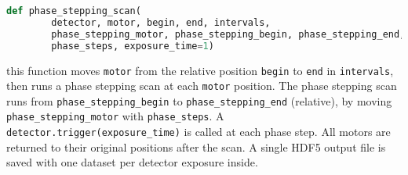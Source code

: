 \begin{lstlisting}[language=Python]
def phase_stepping_scan(
        detector, motor, begin, end, intervals,
        phase_stepping_motor, phase_stepping_begin, phase_stepping_end,
        phase_steps, exposure_time=1)
\end{lstlisting}
this function moves \texttt{motor} from the relative position \texttt{begin}
to \texttt{end} in \texttt{intervals}, then runs a phase stepping scan at
each \texttt{motor} position. The phase stepping scan runs from
\texttt{phase\_stepping\_begin} to
\texttt{phase\_stepping\_end} (relative), by moving
\texttt{phase\_stepping\_motor} with 
\texttt{phase\_steps}. A \texttt{detector.trigger(exposure\_time)} is called
at each phase step.
All motors are returned to their original positions after the scan.
A single HDF5 output file is saved with one dataset per detector exposure
inside.

